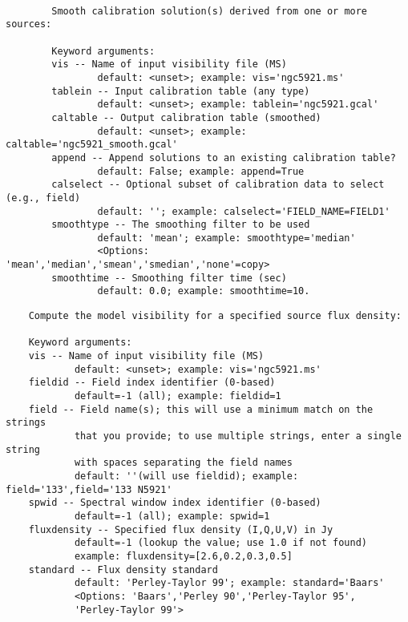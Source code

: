 \vspace{3mm}
\small
\begin{verbatim}

        Smooth calibration solution(s) derived from one or more sources:
        
        Keyword arguments:
        vis -- Name of input visibility file (MS)
                default: <unset>; example: vis='ngc5921.ms'
        tablein -- Input calibration table (any type)
                default: <unset>; example: tablein='ngc5921.gcal'
        caltable -- Output calibration table (smoothed)
                default: <unset>; example: caltable='ngc5921_smooth.gcal'
        append -- Append solutions to an existing calibration table?
                default: False; example: append=True
        calselect -- Optional subset of calibration data to select (e.g., field)
                default: ''; example: calselect='FIELD_NAME=FIELD1'
        smoothtype -- The smoothing filter to be used
                default: 'mean'; example: smoothtype='median'
                <Options: 'mean','median','smean','smedian','none'=copy>
        smoothtime -- Smoothing filter time (sec)
                default: 0.0; example: smoothtime=10.
\end{verbatim}
\normalsize

\vspace{3mm}
\small
\begin{verbatim}
    Compute the model visibility for a specified source flux density: 
    
    Keyword arguments:
    vis -- Name of input visibility file (MS)
            default: <unset>; example: vis='ngc5921.ms'
    fieldid -- Field index identifier (0-based)
            default=-1 (all); example: fieldid=1
    field -- Field name(s); this will use a minimum match on the strings
            that you provide; to use multiple strings, enter a single string
            with spaces separating the field names
            default: ''(will use fieldid); example: field='133',field='133 N5921'
    spwid -- Spectral window index identifier (0-based)
            default=-1 (all); example: spwid=1
    fluxdensity -- Specified flux density (I,Q,U,V) in Jy
            default=-1 (lookup the value; use 1.0 if not found)
            example: fluxdensity=[2.6,0.2,0.3,0.5]
    standard -- Flux density standard
            default: 'Perley-Taylor 99'; example: standard='Baars'
            <Options: 'Baars','Perley 90','Perley-Taylor 95',
            'Perley-Taylor 99'>
\end{verbatim}
\normalsize


